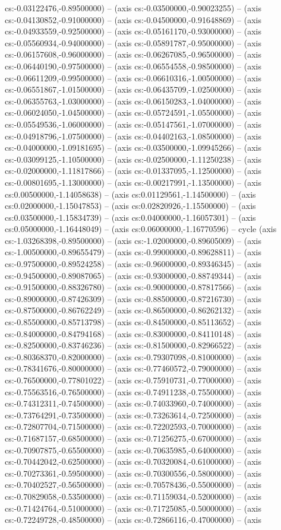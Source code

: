 cs:-0.03122476,-0.89500000) -- (axis cs:-0.03500000,-0.90023255) -- (axis cs:-0.04130852,-0.91000000) -- (axis cs:-0.04500000,-0.91648869) -- (axis cs:-0.04933559,-0.92500000) -- (axis cs:-0.05161170,-0.93000000) -- (axis cs:-0.05560934,-0.94000000) -- (axis cs:-0.05891787,-0.95000000) -- (axis cs:-0.06157608,-0.96000000) -- (axis cs:-0.06267085,-0.96500000) -- (axis cs:-0.06440190,-0.97500000) -- (axis cs:-0.06554558,-0.98500000) -- (axis cs:-0.06611209,-0.99500000) -- (axis cs:-0.06610316,-1.00500000) -- (axis cs:-0.06551867,-1.01500000) -- (axis cs:-0.06435709,-1.02500000) -- (axis cs:-0.06355763,-1.03000000) -- (axis cs:-0.06150283,-1.04000000) -- (axis cs:-0.06024050,-1.04500000) -- (axis cs:-0.05724591,-1.05500000) -- (axis cs:-0.05549536,-1.06000000) -- (axis cs:-0.05147561,-1.07000000) -- (axis cs:-0.04918796,-1.07500000) -- (axis cs:-0.04402163,-1.08500000) -- (axis cs:-0.04000000,-1.09181695) -- (axis cs:-0.03500000,-1.09945266) -- (axis cs:-0.03099125,-1.10500000) -- (axis cs:-0.02500000,-1.11250238) -- (axis cs:-0.02000000,-1.11817866) -- (axis cs:-0.01337095,-1.12500000) -- (axis cs:-0.00801695,-1.13000000) -- (axis cs:-0.00217991,-1.13500000) -- (axis cs:0.00500000,-1.14058638) -- (axis cs:0.01129561,-1.14500000) -- (axis cs:0.02000000,-1.15047853) -- (axis cs:0.02820926,-1.15500000) -- (axis cs:0.03500000,-1.15834739) -- (axis cs:0.04000000,-1.16057301) -- (axis cs:0.05000000,-1.16448049) -- (axis cs:0.06000000,-1.16770596) -- cycle (axis cs:-1.03268398,-0.89500000) -- (axis cs:-1.02000000,-0.89605009) -- (axis cs:-1.00500000,-0.89655479) -- (axis cs:-0.99000000,-0.89628811) -- (axis cs:-0.97500000,-0.89524258) -- (axis cs:-0.96000000,-0.89346345) -- (axis cs:-0.94500000,-0.89087065) -- (axis cs:-0.93000000,-0.88749344) -- (axis cs:-0.91500000,-0.88326780) -- (axis cs:-0.90000000,-0.87817566) -- (axis cs:-0.89000000,-0.87426309) -- (axis cs:-0.88500000,-0.87216730) -- (axis cs:-0.87500000,-0.86762249) -- (axis cs:-0.86500000,-0.86262132) -- (axis cs:-0.85500000,-0.85713798) -- (axis cs:-0.84500000,-0.85113652) -- (axis cs:-0.84000000,-0.84794168) -- (axis cs:-0.83000000,-0.84110148) -- (axis cs:-0.82500000,-0.83746236) -- (axis cs:-0.81500000,-0.82966522) -- (axis cs:-0.80368370,-0.82000000) -- (axis cs:-0.79307098,-0.81000000) -- (axis cs:-0.78341676,-0.80000000) -- (axis cs:-0.77460572,-0.79000000) -- (axis cs:-0.76500000,-0.77801022) -- (axis cs:-0.75910731,-0.77000000) -- (axis cs:-0.75563516,-0.76500000) -- (axis cs:-0.74911238,-0.75500000) -- (axis cs:-0.74312311,-0.74500000) -- (axis cs:-0.74033960,-0.74000000) -- (axis cs:-0.73764291,-0.73500000) -- (axis cs:-0.73263614,-0.72500000) -- (axis cs:-0.72807704,-0.71500000) -- (axis cs:-0.72202593,-0.70000000) -- (axis cs:-0.71687157,-0.68500000) -- (axis cs:-0.71256275,-0.67000000) -- (axis cs:-0.70907875,-0.65500000) -- (axis cs:-0.70635985,-0.64000000) -- (axis cs:-0.70442042,-0.62500000) -- (axis cs:-0.70320084,-0.61000000) -- (axis cs:-0.70273361,-0.59500000) -- (axis cs:-0.70300556,-0.58000000) -- (axis cs:-0.70402527,-0.56500000) -- (axis cs:-0.70578436,-0.55000000) -- (axis cs:-0.70829058,-0.53500000) -- (axis cs:-0.71159034,-0.52000000) -- (axis cs:-0.71424764,-0.51000000) -- (axis cs:-0.71725085,-0.50000000) -- (axis cs:-0.72249728,-0.48500000) -- (axis cs:-0.72866116,-0.47000000) -- (axis 